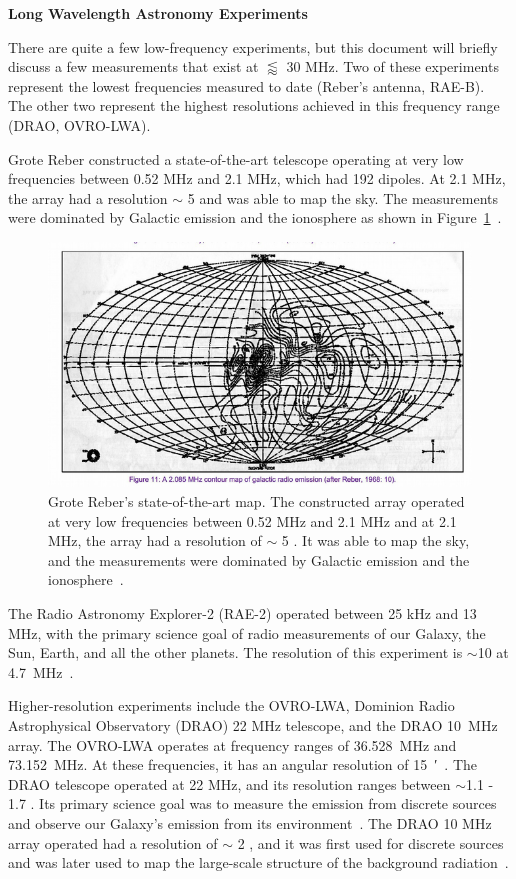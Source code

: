 {\bf{Long Wavelength Astronomy Experiments}}

There are quite a few low-frequency experiments, but this document will briefly discuss a few measurements that exist at $\lessapprox$ 30 MHz. Two of these experiments represent the lowest frequencies measured to date (Reber's antenna, RAE-B). The other two represent the highest resolutions achieved in this frequency range (DRAO, OVRO-LWA).

Grote Reber constructed a state-of-the-art telescope operating at very low frequencies between 0.52 MHz and 2.1 MHz, which had 192 dipoles. At 2.1 MHz, the array had a resolution $\sim$ 5 \degree and was able to map the sky. The measurements were dominated by Galactic emission and the ionosphere as shown in Figure~\ref{Fig:Rebermap}~\citep{1988JRASC..82...93R}. 

\begin{figure}
	\centering
	\includegraphics[width=0.87\linewidth]{Figures/Rebermap}
	\caption{Grote Reber's state-of-the-art map. The constructed array operated at very low frequencies between 0.52 MHz and 2.1 MHz and at 2.1 MHz, the array had a resolution of $\sim$ 5 \degree. It was able to map the sky, and the measurements were dominated by Galactic emission and the ionosphere~\citep{1988JRASC..82...93R}.}
	\label{Fig:Rebermap}
\end{figure}

The Radio Astronomy Explorer-2 (RAE-2) operated between 25 kHz and 13 MHz, with the primary science goal of radio measurements of our Galaxy, the Sun, Earth, and all the other planets. The resolution of this experiment is $\sim$10 \degree at \SI{4.7}{\mega\hertz}~\citep{1975A&A....40..365A}.

Higher-resolution experiments include the OVRO-LWA, Dominion Radio Astrophysical Observatory (DRAO) 22 MHz telescope, and the DRAO \SI{10}{\mega\hertz} array. The OVRO-LWA operates at frequency ranges of \SI{36.528}{\mega\hertz} and \SI{73.152}{\mega\hertz}. At these frequencies, it has an angular resolution of \SI{15}{\arcminute}~\citep{2018AJ....156...32E}. The DRAO telescope operated at 22 MHz, and its resolution ranges between $\sim$1.1 \degree - 1.7 \degree. Its primary science goal was to measure the emission from discrete sources and observe our Galaxy's emission from its environment~\citep{1999A&AS..137....7R}. The DRAO 10 MHz array operated had a resolution of $\sim$ 2  \degree, and it was first used for discrete sources and was later used to map the large-scale structure of the background radiation~\citep{1976MNRAS.177..601C}.

